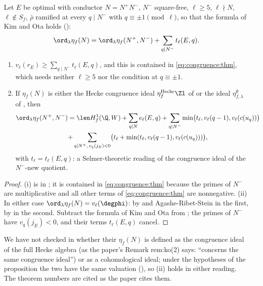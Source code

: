\begin{proposition}\label{prop:congruence:kim-ota}
Let $E$ be optimal with conductor $N=N^+N^-$, $N^-$ square-free, $\ell\ge5$, $\ell\nmid N$, $\ell\notin S_f$, $\bar\rho$ ramified at every $q\mid N^-$ with $q\equiv\pm1\pmod\ell$, so that the formula of Kim and Ota
holds ():
\[
\ord_\lambda\eta_f(N)=\ord_\lambda\eta_f(N^+,N^-)+\sum_{q\mid N^-}t_\ell(E,q).
\]
\begin{enumerate}[label=(\roman*)]
\item $v_\ell(r_E)\ge\sum_{q\mid N^-}t_\ell(E,q)$, and this is contained in \eqref{eq:congruence:thm}, which needs neither $\ell\ge5$ nor the condition at $q\equiv\pm1$.
\item If $\eta_f(N)$ is either the Hecke congruence ideal $\eta^{\mathrm{Hecke}}_f\Zl$ of  or the ideal $\eta^\emptyset_{f,\lambda}$ of , then
\begin{multline*}
\ord_\lambda\eta_f(N^+,N^-)=\len H^1_f(\Q,W)+\sum_{q\mid N}e_\ell(E,q)+\sum_{q\mid N^-}\min\bigl(t_\ell,v_\ell(q-1),v_\ell(c(u_q))\bigr)\\
+\sum_{q\mid N^+,\,v_q(j_E)<0}\bigl(t_\ell+\min(t_\ell,v_\ell(q-1),v_\ell(c(u_q)))\bigr),
\end{multline*}
with $t_\ell=t_\ell(E,q)$: a Selmer-theoretic reading of the congruence ideal of the $N^-$-new quotient.
\end{enumerate}
\end{proposition}

\begin{proof}
(i) is in ; it is contained in \eqref{eq:congruence:thm} because the primes of $N^-$ are multiplicative and all other terms of \eqref{eq:congruence:thm} are nonnegative. (ii) In either case
$\ord_\lambda\eta_f(N)=v_\ell(\degphi)$: by  and Agashe-Ribet-Stein in the first, by  in the second. Subtract the formula of Kim and Ota from
; the primes of $N^-$ have $v_q(j_E)<0$, and their terms $t_\ell(E,q)$ cancel.
\end{proof}

\begin{remark}\label{rem:congruence:kim-ota-identification}
We have not checked in \cite{KimOta} whether their $\eta_f(N)$ is defined as the congruence ideal of the full Hecke algebra (as the paper's Remark rem:ko(2) says: ``concerns the same
congruence ideal'') or as a cohomological ideal; under the hypotheses of the proposition the two have the same valuation (), so (ii) holds in either reading.
The theorem numbers \cite[Theorem 1.1, Definition 2.12]{KimOta} are cited as the paper cites them.
\end{remark}

